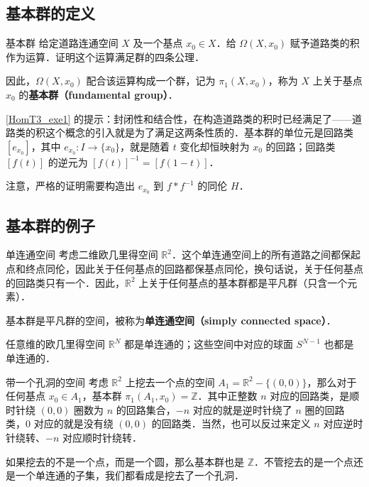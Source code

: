 \subsection{基本群的定义}

\begin{exercise}{基本群}\label{HomT3_exe1}
给定道路连通空间 $X$ 及一个基点 $x_0\in X$．给 $\Omega(X, x_0)$ 赋予道路类的积作为运算．证明这个运算满足群的四条公理．

因此，$\Omega(X, x_0)$ 配合该运算构成一个群，记为 $\pi_1(X, x_0)$，称为 $X$ 上关于基点 $x_0$ 的\textbf{基本群（fundamental group）}．
\end{exercise}

\autoref{HomT3_exe1} 的提示：封闭性和结合性，在构造道路类的积时已经满足了——道路类的积这个概念的引入就是为了满足这两条性质的．基本群的单位元是回路类 $[e_{x_0}]$，其中 $e_{x_0}: I\rightarrow\{x_0\}$，就是随着 $t$ 变化却恒映射为 $x_0$ 的回路；回路类 $[f(t)]$ 的逆元为 $[f(t)]^{-1}=[f(1-t)]$．

注意，严格的证明需要构造出 $e_{x_0}$ 到 $f*f^{-1}$ 的同伦 $H$．

\subsection{基本群的例子}

\begin{example}{单连通空间}\label{HomT3_ex1}
考虑二维欧几里得空间 $\mathbb{R}^2$．这个单连通空间上的所有道路之间都保起点和终点同伦，因此关于任何基点的回路都保基点同伦，换句话说，关于任何基点的回路类只有一个．因此，$\mathbb{R}^2$ 上关于任何基点的基本群都是平凡群（只含一个元素）．

基本群是平凡群的空间，被称为\textbf{单连通空间（simply connected space）}．

任意维的欧几里得空间 $\mathbb{R}^N$ 都是单连通的；这些空间中对应的球面 $S^{N-1}$ 也都是单连通的．
\end{example}

\begin{example}{带一个孔洞的空间}
考虑 $\mathbb{R}^2$ 上挖去一个点的空间 $A_1=\mathbb{R}^2-\{(0,0)\}$，那么对于任何基点 $x_0\in A_1$，基本群 $\pi_1(A_1, x_0)=\mathbb{Z}$．其中正整数 $n$ 对应的回路类，是顺时针绕 $(0,0)$ 圈数为 $n$ 的回路集合，$-n$ 对应的就是逆时针绕了 $n$ 圈的回路类，$0$ 对应的就是没有绕 $(0,0)$ 的回路类．当然，也可以反过来定义 $n$ 对应逆时针绕转、$-n$ 对应顺时针绕转．

如果挖去的不是一个点，而是一个圆，那么基本群也是 $\mathbb{Z}$．不管挖去的是一个点还是一个单连通的子集，我们都看成是挖去了一个孔洞．
\end{example}

